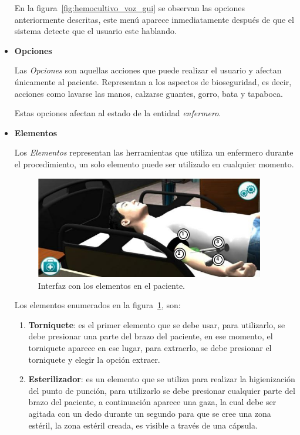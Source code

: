 \begin{itemize}
En la figura~\ref{fig:hemocultivo_voz_gui} se observan las opciones anteriormente
descritas, este menú aparece inmediatamente después de que el sistema detecte
que el usuario este hablando.

\item{\textbf{Opciones}}

Las \emph{Opciones} son aquellas acciones que puede realizar el usuario y afectan
únicamente al paciente. Representan a los aspectos de bioseguridad, es decir,
acciones como lavarse las manos, calzarse guantes, gorro, bata y tapaboca.

Estas opciones afectan al estado de la entidad \emph{enfermero}.

\item{\textbf{Elementos}}

Los \emph{Elementos} representan las herramientas que utiliza un enfermero
durante el procedimiento, un solo elemento puede ser utilizado en cualquier
momento.


\begin{figure}[H]
\centering
\includegraphics[width=10cm]{solucion/images/hemocultivo_elementos.jpg}
\caption{Interfaz con los elementos en el paciente.}
\label{fig:hemocultivo_elementos}
\end{figure}


Los elementos enumerados en la figura~\ref{fig:hemocultivo_elementos}, son:

\begin{enumerate}
\item \textbf{Torniquete}: es el primer elemento que se debe usar, para
    utilizarlo, se debe presionar una parte del brazo del
    paciente, en ese momento, el torniquete aparece en ese lugar, para
    extraerlo, se debe presionar el torniquete y elegir la opción extraer.

\item \textbf{Esterilizador}: es un elemento que se utiliza para realizar la
    higienización del punto de punción, para utilizarlo se debe presionar
    cualquier parte del brazo del paciente, a continuación aparece una gaza, la
    cual debe ser agitada con un dedo durante un segundo para que se cree una
    zona estéril, la zona estéril creada, es visible a través de una cápsula.


\end{enumerate}
\end{itemize}
